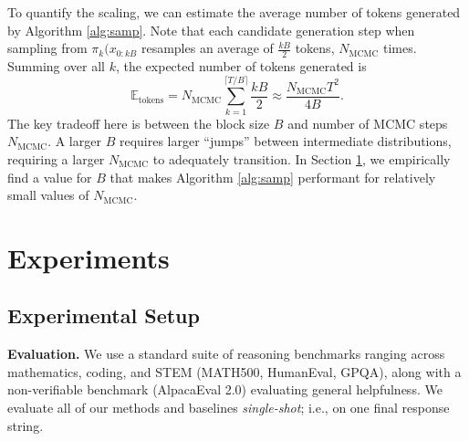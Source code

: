 \documentclass{article}
\renewcommand{\paragraph}[1]{\vspace{.1em}\noindent\textbf{#1}}
\begin{document}
To quantify the scaling, we can estimate the average number of tokens generated by Algorithm \ref{alg:samp}. Note that each candidate generation step when sampling from $\pi_k(x_{0:kB}$ resamples an average of $\frac{kB}{2}$ tokens, $N_{\text{MCMC}}$ times. Summing over all $k$, the expected number of tokens generated is 
\begin{equation}\label{eq:tok}\mathbb{E}_{\text{tokens}} = N_{\text{MCMC}}\sum_{k=1}^{\lceil T/B \rceil} \frac{kB}{2} \approx \frac{N_{\text{MCMC}}T^2}{4B}.\end{equation}
The key tradeoff here is between the block size $B$ and number of MCMC steps $N_{\text{MCMC}}$. A larger $B$ requires larger ``jumps'' between intermediate distributions, requiring a larger $N_{\text{MCMC}}$ to adequately transition. In Section \ref{sec:exp}, we empirically find a value for $B$ that makes Algorithm \ref{alg:samp} performant for relatively small values of $N_{\text{MCMC}}$.


\section{Experiments}\label{sec:exp}



\subsection{Experimental Setup}


\paragraph{Evaluation.} We use a standard suite of reasoning benchmarks ranging across mathematics, coding, and STEM (MATH500, HumanEval, GPQA), along with a non-verifiable benchmark (AlpacaEval 2.0) evaluating general helpfulness. We evaluate all of our methods and baselines \textit{single-shot}; i.e., on one final response string. 
\end{document}
